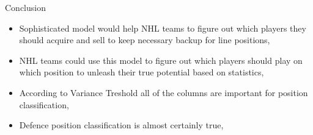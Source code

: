 \begin{frame}{Conclusion}
    \begin{itemize}
        \item Sophisticated model would help NHL teams to figure out which players they should acquire and sell to keep necessary backup for line positions,
        \item NHL teams could use this model to figure out which players should play on which position to unleash their true potential based on statistics,
        \item According to Variance Treshold all of the columns are important for position classification,
        \item Defence position classification is almost certainly true,
    \end{itemize}
\end{frame} 
